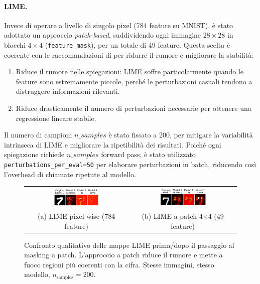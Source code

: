 \documentclass[12pt,a4paper,oneside]{report}
\numberwithin{figure}{chapter}
\numberwithin{table}{chapter}
\begin{document}
\paragraph{LIME.}
Invece di operare a livello di singolo pixel (784 feature su MNIST), è stato
adottato un approccio \textit{patch-based}, suddividendo ogni immagine
$28\times28$ in blocchi $4\times4$ (\texttt{feature\_mask}), per un totale di
49 feature. Questa scelta è coerente con le raccomandazioni di
\citet{ribeiro2016lime} per ridurre il rumore e migliorare la stabilità:
\begin{enumerate}
      \item Riduce il rumore nelle spiegazioni: LIME soffre particolarmente quando le
            feature sono estremamente piccole, perché le perturbazioni casuali tendono a
            distruggere informazioni rilevanti.
      \item Riduce drasticamente il numero di perturbazioni necessarie per ottenere una
            regressione lineare stabile.
\end{enumerate}
Il numero di campioni $n\_samples$ è stato fissato a 200, per mitigare la variabilità intrinseca di LIME e migliorare la ripetibilità dei risultati.
Poiché ogni spiegazione richiede $n\_samples$ forward pass, è stato utilizzato \texttt{perturbations\_per\_eval=50} per elaborare perturbazioni in batch, riducendo così l’overhead di chiamate ripetute al modello.

\begin{figure}[htbp]
      \centering
      \setlength{\tabcolsep}{4pt}
      \begin{tabular}{cc}
            \includegraphics[width=0.45\textwidth]{images/lime_pixelwise.png} &
            \includegraphics[width=0.45\textwidth]{images/lime_patch.png}                                                       \\
            \small (a) LIME pixel-wise (784 feature)                          & \small (b) LIME a patch 4$\times$4 (49 feature)
      \end{tabular}
      \caption{Confronto qualitativo delle mappe LIME prima/dopo il passaggio al masking a patch.
            L’approccio a patch riduce il rumore e mette a fuoco regioni più coerenti con la cifra.
            Stesse immagini, stesso modello, $n_\mathrm{samples}=200$.}
      \label{fig:lime_before_after}
\end{figure}
\end{document}
